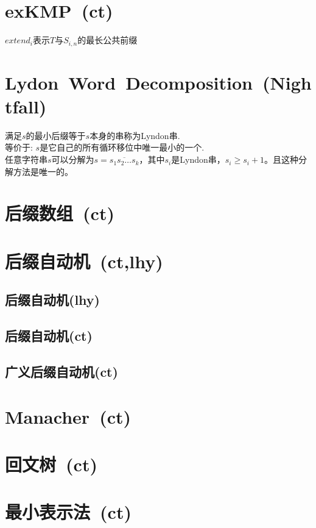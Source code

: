 \section{exKMP\ \small(ct)}
    $ extend_i $表示$ T $与$ S_{i,n} $的最长公共前缀
\section{Lydon\ Word\ Decomposition\ \small(Nightfall)}
	满足$ s $的最小后缀等于$ s $本身的串称为Lyndon串.
	\\等价于: $ s $是它自己的所有循环移位中唯一最小的一个.
	\\任意字符串$ s $可以分解为$ s = \overline{s_1 s_2 \dots s_k} $，其中$ s_i $是Lyndon串，$ s_i \geq s_i + 1 $。且这种分解方法是唯一的。
\section{后缀数组\ \small(ct)}
\section{后缀自动机\ \small(ct,lhy)}
	\subsection*{后缀自动机(lhy)}
	\subsection*{后缀自动机(ct)}
	\subsection*{广义后缀自动机(ct)}
\section{Manacher\ \small(ct)}
\section{回文树\ \small(ct)}
\section{最小表示法\ \small(ct)}
